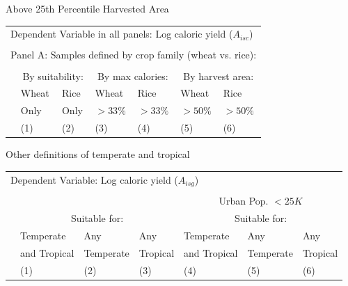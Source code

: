\documentclass[10pt, xcolor=dvipsnames]{beamer}
\begin{document}
\begin{frame}{Above 25th Percentile Harvested Area}\label{harvarea}

{\footnotesize
\begin{tabularx}{\textwidth}{lXXXXXX}
\midrule
\multicolumn{7}{l}{Dependent Variable in all panels: Log caloric yield ($A_{isc}$)} \\ \\
\multicolumn{7}{l}{Panel A: Samples defined by crop family (wheat vs. rice):} \\ \\
 & \multicolumn{2}{c}{By suitability:} & \multicolumn{2}{c}{By max calories:} & \multicolumn{2}{c}{By harvest area:}\\ \cmidrule(lr){2-3} \cmidrule(lr){4-5} \cmidrule(lr){6-7} 
 & Wheat & Rice & Wheat  & Rice  & Wheat  & Rice \\
 & Only & Only &  $>33\%$ & $>33\%$ & $>50\%$ & $>50\%$   \\
 & (1) & (2) & (3) & (4) & (5) & (6) \\
\midrule

\midrule
\end{tabularx}
}

\hfill \hyperlink{robustness}{}
\end{frame}

\begin{frame}{Other definitions of temperate and tropical}\label{definition}

{\footnotesize
\begin{tabularx}{\textwidth}{lXXXXXX}
\midrule
\multicolumn{6}{l}{Dependent Variable: Log caloric yield ($A_{isg}$)} \\ \\
 &   & &                             & \multicolumn{3}{c}{Urban Pop. $<25K$} \\
 & \multicolumn{3}{c}{Suitable for:} & \multicolumn{3}{c}{Suitable for:} \\ \cmidrule(lr){2-4} \cmidrule(lr){5-7}
 & Temperate   & Any       & Any      & Temperate     & Any       & Any      \\
 & and Tropical & Temperate & Tropical & and Tropical & Temperate & Tropical \\
 & (1) & (2) & (3) & (4) & (5) & (6) \\
\midrule

\midrule
\end{tabularx}
}

\hfill \hyperlink{robustness}{}
\end{frame}
\end{document}
